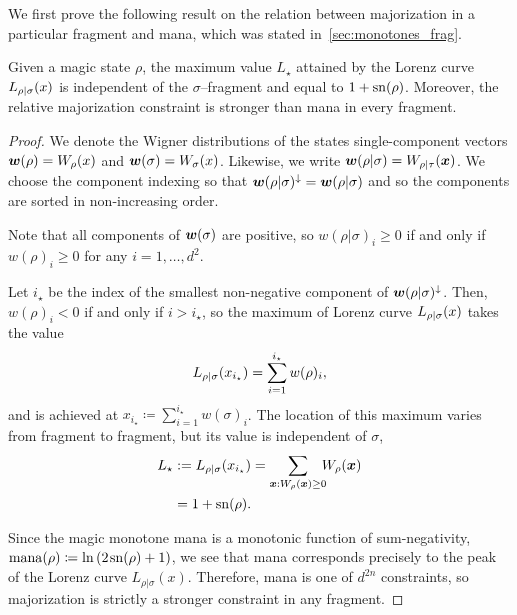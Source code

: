 \documentclass[pra,
aps,
twocolumn,
superscriptaddress,
groupedaddress,
nofootinbib,
reprint
]{revtex4-1}
\begin{document}
We first prove the following result on the relation between majorization in a particular fragment and mana, which was stated in~\cref{sec:monotones_frag}.
\begingroup
\def\thetheorem{\ref{lem:lcmax}}
\begin{theorem}
	Given a magic state $\rho$, the maximum value $L_\star$ attained by the Lorenz curve ${L_{\rho|\sigma}}(x)$ is independent of the $\sigma$--fragment and equal to $1+{{\rm{sn}}(\rho)}$. Moreover, the relative majorization constraint is stronger than mana in every fragment.
\end{theorem}
\addtocounter{theorem}{-1}
\endgroup
\begin{proof}
	We denote the Wigner distributions of the states single-component vectors $\boldsymbol{w}(\rho)=W_\rho(x)$ and $ \boldsymbol{w}(\sigma)=W_\sigma(x)$. Likewise, we write $\boldsymbol{w}(\rho|\sigma) = W_{\rho|\tau}(\boldsymbol{x})$.
	We choose the component indexing so that $\boldsymbol{w}(\rho|\sigma)^\downarrow = \boldsymbol{w}(\rho|\sigma)$ and so the components are sorted in non-increasing order.

Note that all components of $\bm{w}(\sigma)$ are positive, so $w(\rho|\sigma)_i \geq 0$ if and only if $w(\rho)_i \geq 0$ for any $i=1,\dots,d^2$.
	
	Let $i_\star$ be the index of the smallest non-negative component of $\boldsymbol{w}(\rho|\sigma)^\downarrow$.
	Then, $w(\rho)_i < 0$ if and only if $i > i_\star$, so the maximum of Lorenz curve ${L_{\rho|\sigma}}(x)$ takes the value 
	\begin{equation}
		{L_{\rho|\sigma}}(x_{i_\star}) = \sum_{i=1}^{i_\star} w(\rho)_i,
	\end{equation}
	and is achieved at $x_{i_\star} \coloneqq \sum_{i=1}^{i_\star} w(\sigma)_i$. The location of this maximum varies from fragment to fragment, but its value is independent of $\sigma$,
	\begin{align}
	L_\star &:=	\lc{\rho}{\sigma}(x_{i_\star}) 
		= \sum\limits_{\bmx: \W[\bmx]{\rho} \geq 0}\hspace{-5pt} \W[\bmx]{\rho} \nonumber \\
		&= 1 + \sn{\rho}.
	\end{align}
	
Since the magic monotone mana is a monotonic function of sum-negativity, $\rm{mana}(\rho) \coloneqq \ln{(2\hspace{1pt} {{\rm{sn}}(\rho)} +1)}$, we see that mana corresponds precisely to the peak of the Lorenz curve $L_{\rho|\sigma}(x)$. Therefore, mana is one of $d^{2n}$ constraints, so majorization is strictly a stronger constraint in any fragment.
\end{proof}
\end{document}
